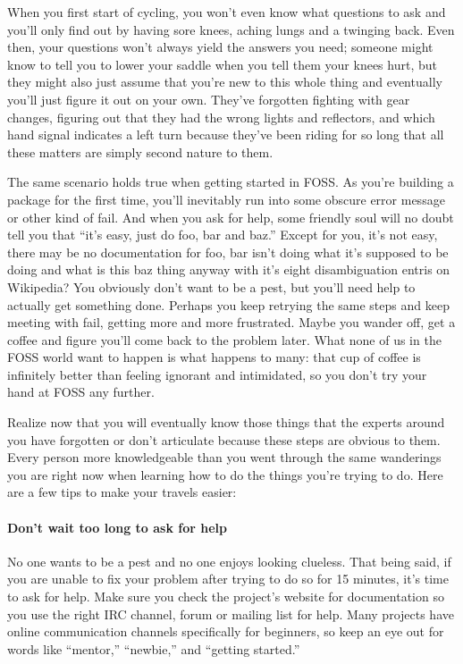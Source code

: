 When you first start of cycling, you won’t even know what questions to ask and you’ll only find out by having sore knees, aching lungs and a twinging back. Even then, your questions won’t always yield the answers you need; someone might know to tell you to lower your saddle when you tell them your knees hurt, but they might also just assume that you’re new to this whole thing and eventually you’ll just figure it out on your own. They’ve forgotten fighting with gear changes, figuring out that they had the wrong lights and reflectors, and which hand signal indicates a left turn because they’ve been riding for so long that all these matters are simply second nature to them.

The same scenario holds true when getting started in FOSS. As you’re building a package for the first time, you’ll inevitably run into some obscure error message or other kind of fail. And when you ask for help, some friendly soul will no doubt tell you that “it’s easy, just do foo, bar and baz.” Except for you, it’s not easy, there may be no documentation for foo, bar isn’t doing what it’s supposed to be doing and what is this baz thing anyway with it’s eight disambiguation entris on Wikipedia? You obviously don’t want to be a pest, but you’ll need help to actually get something done. Perhaps you keep retrying the same steps and keep meeting with fail, getting more and more frustrated. Maybe you wander off, get a coffee and figure you’ll come back to the problem later. What none of us in the FOSS world want to happen is what happens to many: that cup of coffee is infinitely better than feeling ignorant and intimidated, so you don’t try your hand at FOSS any further.

Realize now that you will eventually know those things that the experts around you have forgotten or don’t articulate because these steps are obvious to them. Every person more knowledgeable than you went through the same wanderings you are right now when learning how to do the things you’re trying to do. Here are a few tips to make your travels easier:

\paragraph*{Don’t wait too long to ask for help} No one wants to be a pest and no one enjoys looking clueless. That being said, if you are unable to fix your problem after trying to do so for 15 minutes, it’s time to ask for help. Make sure you check the project’s website for documentation so you use the right IRC channel, forum or mailing list for help. Many projects have online communication channels specifically for beginners, so keep an eye out for words like “mentor,” “newbie,” and “getting started.”

